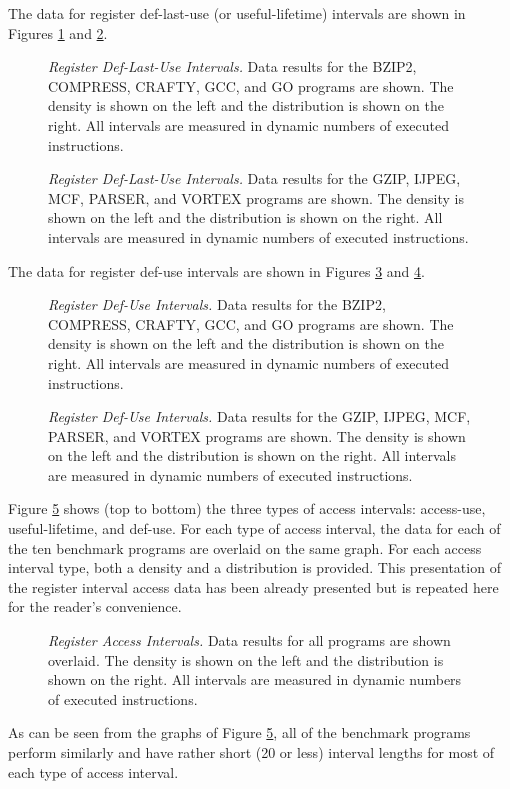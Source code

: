 \documentclass[10pt,dvips]{article}
\begin{document}
The data for register def-last-use (or useful-lifetime) intervals are
shown in Figures \ref{fig:aa_rlife} 
and \ref{fig:ab_rlife}.
%
\begin{figure}
\centering
{}
\caption{{\em Register Def-Last-Use Intervals.} 
Data results for the 
BZIP2, COMPRESS, CRAFTY, GCC, and GO programs are shown.
The density is shown on the left and the distribution is shown
on the right.
All intervals are measured in dynamic numbers of executed instructions.}
\label{fig:aa_rlife}
\end{figure}
%
\begin{figure}
\centering
{}
\caption{{\em Register Def-Last-Use Intervals.} 
Data results for the
GZIP, IJPEG, MCF, PARSER, and VORTEX programs are shown.
The density is shown on the left and the distribution is shown
on the right.
All intervals are measured in dynamic numbers of executed instructions.}
\label{fig:ab_rlife}
\end{figure}
%
%

The data for register def-use intervals are
shown in Figures \ref{fig:aa_ruse} 
and \ref{fig:ab_ruse}.
%
\begin{figure}
\centering
{}
\caption{{\em Register Def-Use Intervals.} 
Data results for the 
BZIP2, COMPRESS, CRAFTY, GCC, and GO programs are shown.
The density is shown on the left and the distribution is shown
on the right.
All intervals are measured in dynamic numbers of executed instructions.}
\label{fig:aa_ruse}
\end{figure}
%
\begin{figure}
\centering
{}
\caption{{\em Register Def-Use Intervals.} 
Data results for the
GZIP, IJPEG, MCF, PARSER, and VORTEX programs are shown.
The density is shown on the left and the distribution is shown
on the right.
All intervals are measured in dynamic numbers of executed instructions.}
\label{fig:ab_ruse}
\end{figure}
%
%

Figure \ref{fig:a_rover} shows (top to bottom)
the three types of access intervals:
access-use, useful-lifetime, and def-use.
For each type of access interval, the data for each of the
ten benchmark programs are overlaid on the same graph.
For each access interval type, both a density 
and a distribution is provided.
This presentation of the register interval access
data has been already presented but
is repeated here for the reader's convenience.
%
\begin{figure}[tb]
\centering
{}
\caption{{\em Register Access Intervals.} 
Data results for all programs are shown overlaid.
The density is shown on the left and the distribution is shown
on the right.
All intervals are measured in dynamic numbers of executed instructions.}
\label{fig:a_rover}
\end{figure}
%
As can be seen from the graphs of Figure \ref{fig:a_rover},
all of the benchmark programs perform similarly and have
rather short (20 or less) interval lengths for most of each type
of access interval.
%
%
%
\end{document}
